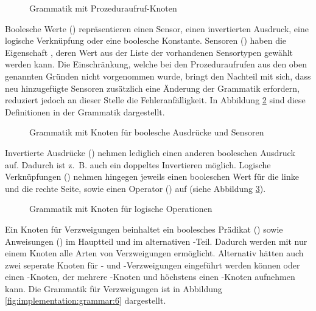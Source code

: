 \begin{figure}[h]
  
  \caption{Grammatik mit Prozeduraufruf-Knoten}
  \label{fig:implementation:grammar:3}
\end{figure}

Boolesche Werte () repräsentieren einen Sensor, einen invertierten Ausdruck, eine logische Verknüpfung oder eine boolesche Konstante. Sensoren () haben die Eigenschaft , deren Wert aus der Liste der vorhandenen Sensortypen gewählt werden kann. Die Einschränkung, welche bei den Prozeduraufrufen aus den oben genannten Gründen nicht vorgenommen wurde, bringt den Nachteil mit sich, dass neu hinzugefügte Sensoren zusätzlich eine Änderung der Grammatik erfordern, reduziert jedoch an dieser Stelle die Fehleranfälligkeit. In Abbildung \ref{fig:implementation:grammar:4} sind diese Definitionen in der Grammatik dargestellt.

\begin{figure}[h]
  
  \caption{Grammatik mit Knoten für boolesche Ausdrücke und Sensoren}
  \label{fig:implementation:grammar:4}
\end{figure}

Invertierte Ausdrücke () nehmen lediglich einen anderen booleschen Ausdruck auf. Dadurch ist z.~B. auch ein doppeltes Invertieren möglich. Logische Verknüpfungen () nehmen hingegen jeweils einen booleschen Wert für die linke und die rechte Seite, sowie einen Operator () auf (siehe Abbildung \ref{fig:implementation:grammar:5}).

\begin{figure}[h]
  
  \caption{Grammatik mit Knoten für logische Operationen}
  \label{fig:implementation:grammar:5}
\end{figure}

Ein Knoten für Verzweigungen beinhaltet ein boolesches Prädikat () sowie Anweisungen () im Hauptteil und im alternativen -Teil. Dadurch werden mit nur einem Knoten alle Arten von Verzweigungen ermöglicht. Alternativ hätten auch zwei seperate Knoten für - und -Ver\-zwei\-gungen eingeführt werden können oder einen -Kno\-ten, der mehrere -Kno\-ten und höchstens einen -Kno\-ten aufnehmen kann. Die Grammatik für Verzweigungen ist in Abbildung \ref{fig:implementation:grammar:6} dargestellt.

